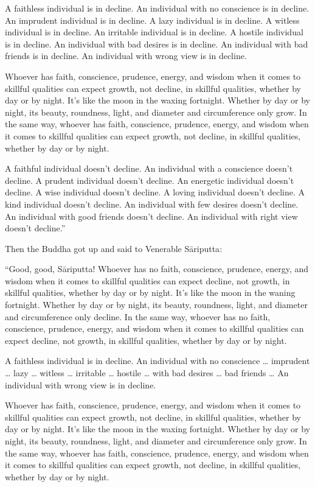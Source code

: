 \documentclass[12pt,openany]{book}%
\begin{document}
A faithless individual is in decline. An individual with no conscience is in decline. An imprudent individual is in decline. A lazy individual is in decline. A witless individual is in decline. An irritable individual is in decline. A hostile individual is in decline. An individual with bad desires is in decline. An individual with bad friends is in decline. An individual with wrong view is in decline. 

Whoever has faith, conscience, prudence, energy, and wisdom when it comes to skillful qualities can expect growth, not decline, in skillful qualities, whether by day or by night. It’s like the moon in the waxing fortnight. Whether by day or by night, its beauty, roundness, light, and diameter and circumference only grow. In the same way, whoever has faith, conscience, prudence, energy, and wisdom when it comes to skillful qualities can expect growth, not decline, in skillful qualities, whether by day or by night. 

A faithful individual doesn’t decline. An individual with a conscience doesn’t decline. A prudent individual doesn’t decline. An energetic individual doesn’t decline. A wise individual doesn’t decline. A loving individual doesn’t decline. A kind individual doesn’t decline. An individual with few desires doesn’t decline. An individual with good friends doesn’t decline. An individual with right view doesn’t decline.” 

Then the Buddha got up and said to Venerable \textsanskrit{Sāriputta}: 

“Good, good, \textsanskrit{Sāriputta}! Whoever has no faith, conscience, prudence, energy, and wisdom when it comes to skillful qualities can expect decline, not growth, in skillful qualities, whether by day or by night. It’s like the moon in the waning fortnight. Whether by day or by night, its beauty, roundness, light, and diameter and circumference only decline. In the same way, whoever has no faith, conscience, prudence, energy, and wisdom when it comes to skillful qualities can expect decline, not growth, in skillful qualities, whether by day or by night. 

A faithless individual is in decline. An individual with no conscience … imprudent … lazy … witless … irritable … hostile … with bad desires … bad friends … An individual with wrong view is in decline. 

Whoever has faith, conscience, prudence, energy, and wisdom when it comes to skillful qualities can expect growth, not decline, in skillful qualities, whether by day or by night. It’s like the moon in the waxing fortnight. Whether by day or by night, its beauty, roundness, light, and diameter and circumference only grow. In the same way, whoever has faith, conscience, prudence, energy, and wisdom when it comes to skillful qualities can expect growth, not decline, in skillful qualities, whether by day or by night. 
\end{document}
